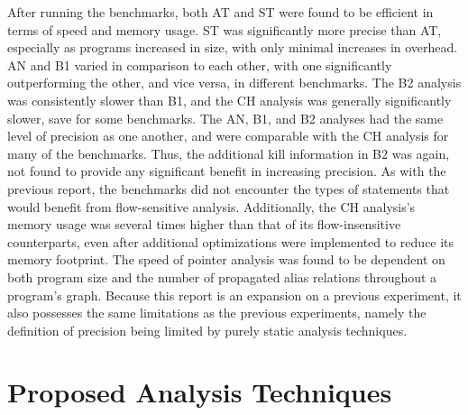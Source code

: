 After running the benchmarks, both AT and ST were found to be efficient in terms of speed and memory usage. ST was significantly more precise than AT, especially as programs increased in size, with only minimal increases in overhead. AN and B1 varied in comparison to each other, with one significantly outperforming the other, and vice versa, in different benchmarks. The B2 analysis was consistently slower than B1, and the CH analysis was generally significantly slower, save for some benchmarks. The AN, B1, and B2 analyses had the same level of precision as one another, and were comparable with the CH analysis for many of the benchmarks. Thus, the additional kill information in B2 was again, not found to provide any significant benefit in increasing precision. As with the previous report, the benchmarks did not encounter the types of statements that would benefit from flow-sensitive analysis. Additionally, the CH analysis's memory usage was several times higher than that of its flow-insensitive counterparts, even after additional optimizations were implemented to reduce its memory footprint. The speed of pointer analysis was found to be dependent on both program size and the number of propagated alias relations throughout a program's graph. Because this report is an expansion on a previous experiment, it also possesses the same limitations as the previous experiments, namely the definition of precision being limited by purely static analysis techniques.

\section{Proposed Analysis Techniques}

